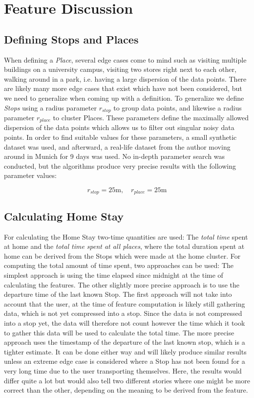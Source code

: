 \section{Feature Discussion}

\subsection{Defining Stops and Places}
When defining a \textit{Place}, several edge cases come to mind such as visiting multiple buildings on a university campus, visiting two stores right next to each other, walking around in a park, i.e. having a large dispersion of the data points. There are likely many more edge cases that exist which have not been considered, but we need to generalize when coming up with a definition. To generalize we define \textit{Stops} using a radius parameter $r_{stop}$ to group data points, and likewise a radius parameter $r_{place}$ to cluster Places. These parameters define the maximally allowed dispersion of the data points which allows us to filter out singular noisy data points. In order to find suitable values for these parameters, a small synthetic dataset was used, and afterward, a real-life dataset from the author moving around in Munich for 9 days was used. No in-depth parameter search was conducted, but the algorithms produce very precise results with the following parameter values:

\begin{equation}
\label{eq:stop-place-radius}
r_{stop} = 25 \text{m}, \quad r_{place} = 25 \text{m}
\end{equation}


\subsection{Calculating Home Stay}
For calculating the Home Stay two-time quantities are used: The \textit{total time} spent at home and the\textit{ total time spent at all places}, where the total duration spent at home can be derived from the Stops which were made at the home cluster. For computing the total amount of time spent, two approaches can be used: The simplest approach is using the time elapsed since midnight at the time of calculating the features. The other slightly more precise approach is to use the departure time of the last known Stop. The first approach will not take into account that the user, at the time of feature computation is likely still gathering data, which is not yet compressed into a stop. Since the data is not compressed into a stop yet, the data will therefore not count however the time which it took to gather this data will be used to calculate the total time. The more precise approach uses the timestamp of the departure of the last known stop, which is a tighter estimate. It can be done either way and will likely produce similar results unless an extreme edge case is considered where a Stop has not been found for a very long time due to the user transporting themselves. Here, the results would differ quite a lot but would also tell two different stories where one might be more correct than the other, depending on the meaning to be derived from the feature.

